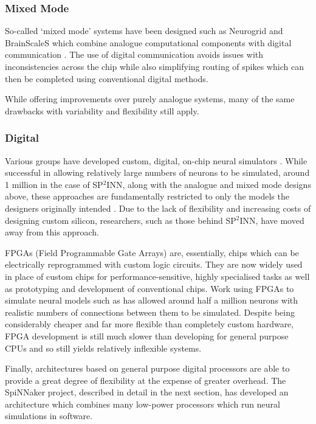 			\subsubsection{Mixed Mode}
				
				So-called `mixed mode' systems have been designed such as Neurogrid and
				BrainScaleS which combine analogue computational components with digital
				communication \cite{choudhary12,maguire07}. The use of digital
				communication avoids issues with inconsistencies across the chip while
				also simplifying routing of spikes which can then be completed using
				conventional digital methods.
				
				While offering improvements over purely analogue systems, many of the same
				drawbacks with variability and flexibility still apply.
			
			\subsubsection{Digital}
				
				Various groups have developed custom, digital, on-chip neural simulators
				\cite{prange93,jahnke96,schoenauer99,mehrtash03}. While successful in
				allowing relatively large numbers of neurons to be simulated, around 1
				million in the case of SP$^2$INN, along with the analogue and mixed mode
				designs above, these approaches are fundamentally restricted to only the
				models the designers originally intended \cite{mehrtash03}. Due to the
				lack of flexibility and increasing costs of designing custom silicon,
				researchers, such as those behind SP$^2$INN, have moved away from this
				approach.
				
				FPGAs (Field Programmable Gate Arrays) are, essentially, chips which can
				be electrically reprogrammed with custom logic circuits. They are now
				widely used in place of custom chips for performance-sensitive, highly
				specialised tasks as well as prototyping and development of conventional
				chips. Work using FPGAs to simulate neural models such as
				\cite{hellmich05} has allowed around half a million neurons with realistic
				numbers of connections between them to be simulated. Despite being
				considerably cheaper and far more flexible than completely custom
				hardware, FPGA development is still much slower than developing for
				general purpose CPUs and so still yields relatively inflexible systems.
				
				Finally, architectures based on general purpose digital processors are
				able to provide a great degree of flexibility at the expense of greater
				overhead\cite{furber07}. The SpiNNaker project, described in detail in the
				next section, has developed an architecture which combines many low-power
				processors which run neural simulations in software.
		
